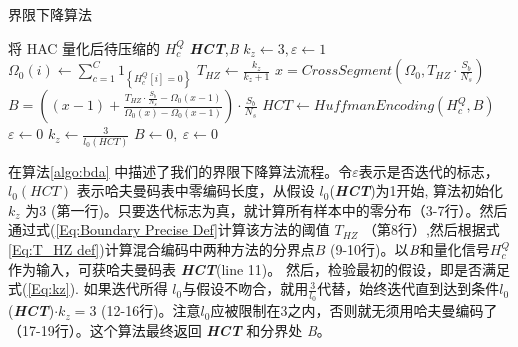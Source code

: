 \renewcommand{\algorithmicrequire}{ \textbf{Input:}}      %
\renewcommand{\algorithmicensure}{ \textbf{Output:}}     %
\begin{algorithm}
\caption{界限下降算法}
\label{algo:bda}
\begin{algorithmic}[1]  
\Require 将 HAC 量化后待压缩的 $H_c^Q$
\Ensure  \textbf{\emph{HCT}},\emph{B}
\State	$k_z\leftarrow3,\varepsilon\leftarrow1$
            \State $\Omega_0(i)\leftarrow \sum_{c=1}^C 1_{\left\{H_c^Q[i]=0\right\}}$
        \EndFor
    \EndFor
    \State $T_{HZ}\leftarrow \frac{k_z}{k_z+1}$
    \State $x=CrossSegment\left(\Omega_0,T_{HZ}\cdot\frac{S_b}{N_s}\right)$
    \State $B=\left((x-1)+\frac{T_{HZ}\cdot \frac{S_b}{N_s}-\Omega_0(x-1)}{\Omega_0(x)-\Omega_0(x-1)}\right)\cdot \frac{S_b}{N_s}$
    \State $HCT\leftarrow Huffman Encoding(H_c^Q,B)$
        \State $\varepsilon\leftarrow 0$
    \Else
    	    \State $k_z\leftarrow \frac{3}{l_0(HCT)}$
    	\Else
	        \State $B\leftarrow 0,\ \varepsilon\leftarrow0$
	    \EndIf
    \EndIf
\EndWhile
\end{algorithmic} 
\end{algorithm}


在算法\ref{algo:bda} 中描述了我们的界限下降算法流程。令$\varepsilon$表示是否迭代的标志， $l_0(HCT)$ 表示哈夫曼码表中零编码长度，从假设 $l_0$(\textbf{\emph{HCT}})为1开始, 算法初始化$k_z$ 为3 (第一行)。只要迭代标志为真，就计算所有样本中的零分布（3-7行）。然后通过式(\ref{Eq:Boundary Precise Def}计算该方法的阈值 $T_{HZ}$ （第8行）,然后根据式\ref{Eq:T_HZ def})计算混合编码中两种方法的分界点$B$ (9-10行)。以$\emph{B}$和量化信号$H_c^Q$作为输入，可获哈夫曼码表 \textbf{\emph{HCT}}(line 11)。
然后，检验最初的假设，即是否满足式(\ref{Eq:kz}). 如果迭代所得 $l_0$与假设不吻合，就用$\frac{3}{l_0}$代替，始终迭代直到达到条件$l_0$(\textbf{\emph{HCT}})$\cdot k_z = 3$ (12-16行)。注意$l_0$应被限制在3之内，否则就无须用哈夫曼编码了（17-19行）。这个算法最终返回 \textbf{\emph{HCT}} 和分界处 \emph{B}。

